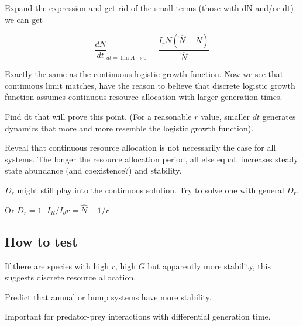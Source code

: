 \documentclass[12pt]{article}
\begin{document}
Expand the expression and get rid of the small terms (those with dN and/or dt) we can get

\begin{equation}
\frac{dN}{dt}_{dt = \lim{A \to 0}} = \frac{I_rN (\hat{N}-N)}{\hat{N}}
\end{equation}

Exactly the same as the continuous logistic growth function. Now we see that continuous limit matches, have the reason to believe that discrete logistic growth function assumes continuous resource allocation with larger generation times.

Find dt that will prove this point. (For a reasonable $r$ value, smaller $dt$ generates dynamics that more and more resemble the logistic growth function).

Reveal that continuous resource allocation is not necessarily the case for all systems. The longer the resource allocation period, all else equal, increases steady state abundance (and coexistence?) and stability.

$D_r$ might still play into the continuous solution. Try to solve one with general $D_r$.

Or $D_r=1$. $I_R/I_\theta r = \hat{N} + 1/r$



\subsection{How to test}
If there are species with high $r$, high $G$ but apparently more stability, this suggests discrete resource allocation. 

Predict that annual or bump systems have more stability.

Important for predator-prey interactions with differential generation time.
\end{document}
